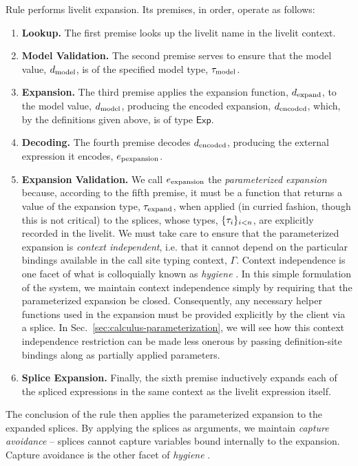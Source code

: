 Rule  performs livelit expansion. Its premises, in order, operate as follows:
\begin{enumerate}
    \item \textbf{Lookup.} The first premise looks up the livelit name in the livelit context.
    \item \textbf{Model Validation.} The second premise serves to ensure that the model value, $d_\text{model}$, is of the
    specified model type, $\tau_\text{model}$.
    \item \textbf{Expansion.} The third premise applies the expansion function, $d_\text{expand}$, to the model value, $d_\text{model}$,
    producing the encoded expansion, $d_\text{encoded}$, which, by the definitions given above, is of type $\mathsf{Exp}$.
    \item \textbf{Decoding.} The fourth premise decodes $d_\text{encoded}$, producing the external expression it encodes, $e_\text{pexpansion}$.
    \item \textbf{Expansion Validation.} We call $e_\text{expansion}$ the \emph{parameterized expansion} because, according to the fifth premise,
    it must be a function that returns a value of the expansion type, $\tau_\text{expand}$, when applied (in curried fashion, though this is not critical)
    to the splices, whose types, $\{\tau_i\}_{i < n}$, are explicitly recorded in the livelit.
    We must take care to ensure that the parameterized expansion is \emph{context independent},
    i.e. that it cannot depend on the particular bindings available in the call site typing context, $\Gamma$.
    Context independence is one facet of what is colloquially known as \emph{hygiene} \cite{TLMs}.
    In this simple formulation of the system, we maintain context independence simply by
    requiring that the parameterized expansion be
    closed. Consequently, any necessary helper functions used in the expansion must be provided explicitly by the client
    via a splice. In Sec.~\ref{sec:calculus-parameterization}, we will see how this context independence
    restriction can be made
    less onerous by passing definition-site bindings along as partially applied parameters.
    \item \textbf{Splice Expansion.} Finally, the sixth premise inductively expands each of the spliced expressions in the same context as the livelit
    expression itself.
\end{enumerate}
The conclusion of the rule then applies the parameterized expansion to the expanded splices.
By applying the splices as arguments, we maintain \emph{capture avoidance} -- splices cannot capture variables
bound internally to the expansion. Capture avoidance is the other facet of \emph{hygiene} \cite{TLMs}.

